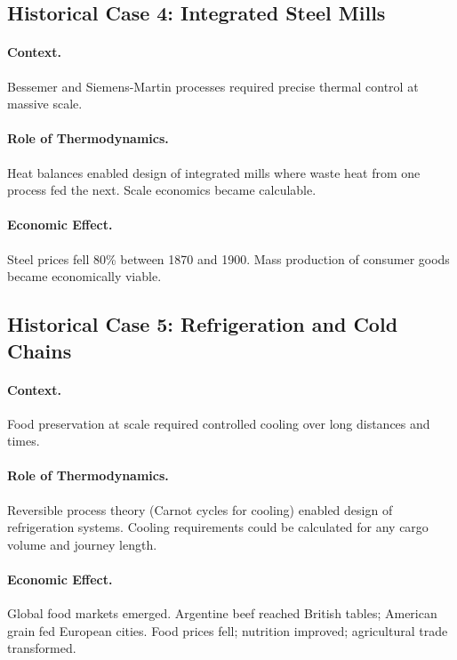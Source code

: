 \subsection{Historical Case 4: Integrated Steel Mills}

\paragraph{Context.} Bessemer and Siemens-Martin processes required precise
thermal control at massive scale.

\paragraph{Role of Thermodynamics.} Heat balances enabled design of integrated
mills where waste heat from one process fed the next. Scale economics became
calculable.

\paragraph{Economic Effect.} Steel prices fell 80\% between 1870 and 1900.
Mass production of consumer goods became economically viable.

\subsection{Historical Case 5: Refrigeration and Cold Chains}

\paragraph{Context.} Food preservation at scale required controlled cooling
over long distances and times.

\paragraph{Role of Thermodynamics.} Reversible process theory (Carnot cycles
for cooling) enabled design of refrigeration systems. Cooling requirements
could be calculated for any cargo volume and journey length.

\paragraph{Economic Effect.} Global food markets emerged. Argentine beef
reached British tables; American grain fed European cities. Food prices
fell; nutrition improved; agricultural trade transformed.


